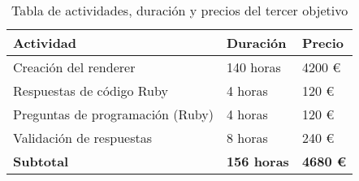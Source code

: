 \begin{table}[!ht]
\begin{center}
\begin{tabular}{|p{80mm}|p{25mm}|p{20mm}|} \hline 
\textbf{Actividad} & \textbf{Duraci\'on} & \textbf{Precio} \\ \hline

Creaci\'on del renderer &
140 horas &
4200 \euro{}
\\
\hline

Respuestas de c\'odigo Ruby &
4 horas &
120 \euro{}
\\
\hline

Preguntas de programaci\'on (Ruby) &
4 horas &
120 \euro{}
\\
\hline

Validaci\'on de respuestas &
8 horas &
240 \euro{}
\\
\hline \hline

{\bfseries Subtotal} &
{\bfseries 156 horas} &
{\bfseries 4680 \euro{}}
\\
\hline

\end{tabular}
\end{center}
\caption{Tabla de actividades, duraci\'on y precios del tercer objetivo}
\label{table:resOthers3}
\end{table}
